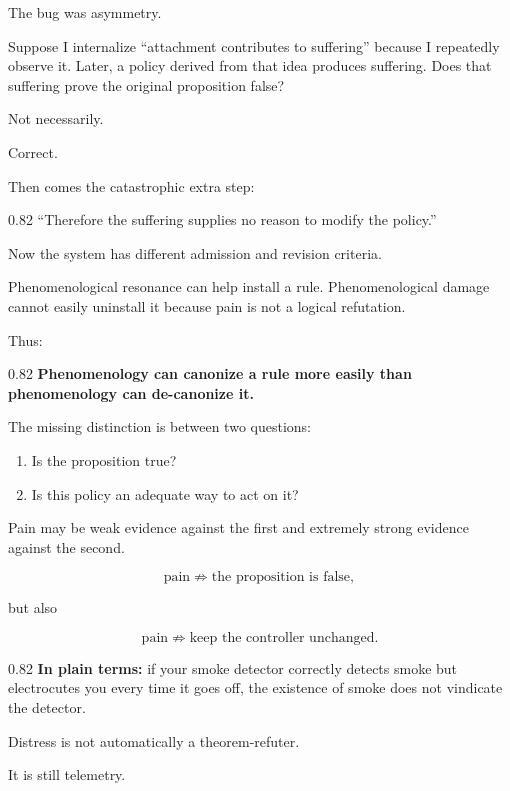 \documentclass[10pt,letterpaper]{article}
\providecommand{\tightlist}{%
  \setlength{\itemsep}{0.15em}\setlength{\parskip}{0pt}}
\newenvironment{paperbody}
  {\begingroup\justifying}
  {\par\endgroup}
\newenvironment{voicebox}
  {\Needspace{3.5\baselineskip}\par\vspace{0.22em}\begin{center}\begingroup
   \begin{lrbox}{\voiceboxsave}\begin{varwidth}{0.82\linewidth}
   \small\rmfamily\upshape\RaggedRight}
  {\end{varwidth}\end{lrbox}\fbox{\usebox{\voiceboxsave}}
   \endgroup\end{center}\vspace{0.22em}}
\newenvironment{plainbox}
  {\Needspace{3.5\baselineskip}\par\vspace{0.24em}\begin{center}\begingroup
   \begin{lrbox}{\plainboxsave}\begin{varwidth}{0.82\linewidth}
   \small\rmfamily\upshape\RaggedRight}
  {\end{varwidth}\end{lrbox}\fbox{\usebox{\plainboxsave}}
   \endgroup\end{center}\vspace{0.24em}}
\begin{document}
\begin{paperbody}
The bug was asymmetry.

Suppose I internalize ``attachment contributes to suffering'' because I
repeatedly observe it. Later, a policy derived from that idea produces
suffering. Does that suffering prove the original proposition false?

Not necessarily.

Correct.

Then comes the catastrophic extra step:

\begin{voicebox}
``Therefore the suffering supplies no reason to modify the policy.''
\end{voicebox}

Now the system has different admission and revision criteria.

Phenomenological resonance can help install a rule. Phenomenological
damage cannot easily uninstall it because pain is not a logical
refutation.

Thus:

\begin{voicebox}
\textbf{Phenomenology can canonize a rule more easily than phenomenology
can de-canonize it.}
\end{voicebox}

The missing distinction is between two questions:

\begin{enumerate}
\def\labelenumi{\arabic{enumi}.}
\tightlist
\item
  Is the proposition true?
\item
  Is this policy an adequate way to act on it?
\end{enumerate}

Pain may be weak evidence against the first and extremely strong
evidence against the second.

\[
\text{pain}\not\Rightarrow\text{the proposition is false},
\]

but also

\[
\text{pain}\not\Rightarrow\text{keep the controller unchanged}.
\]

\begin{plainbox}
\textbf{In plain terms:} if your smoke detector correctly detects smoke
but electrocutes you every time it goes off, the existence of smoke does
not vindicate the detector.
\end{plainbox}

Distress is not automatically a theorem-refuter.

It is still telemetry.


\end{paperbody}
\end{document}
